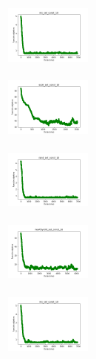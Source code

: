 \begin{figure}[H]
    \centering
    \begin{subfigure}
        \centering
        \includegraphics[width=0.234\textwidth]{img/am01/iris_set_const_10_949004259_cost.png}
    \end{subfigure}
    \hfill
    \begin{subfigure}
        \centering
        \includegraphics[width=0.234\textwidth]{img/am01/ecoli_set_const_10_949004259_cost.png}
    \end{subfigure}
    \hfill
    \begin{subfigure}
        \centering
        \includegraphics[width=0.234\textwidth]{img/am01/rand_set_const_10_949004259_cost.png}
    \end{subfigure}
    \hfill
    \begin{subfigure}
        \centering
        \includegraphics[width=0.234\textwidth]{img/am01/newthyroid_set_const_10_949004259_cost.png}
    \end{subfigure}
    \hfill
    \begin{subfigure}
        \centering
        \includegraphics[width=0.234\textwidth]{img/am01/iris_set_const_10_589741062_cost.png}
    \end{subfigure}
    \hfill

\end{figure}
